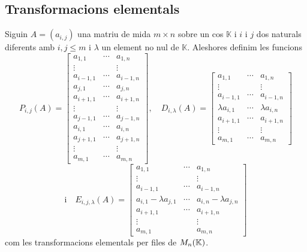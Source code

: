 \documentclass[../../Main.tex]{subfiles}
\begin{document}
	\subsection{Transformacions elementals}
	\begin{definition} %
		\label{def:transformacions elementals}
		Siguin \(A=(a_{i,j})\) una matriu de mida \(m\times n\) sobre un cos \(\mathbb{K}\) i \(i\) i \(j\) dos naturals diferents amb \(i,j\leq m\) i \(\lambda\) un element no nul de \(\mathbb{K}\). Aleshores definim les funcions
		\[P_{i,j}(A)=\left[\begin{matrix}
		a_{1,1} & \cdots & a_{1,n} \\
		\vdots & & \vdots \\
		a_{i-1,1} & \cdots & a_{i-1,n} \\
		a_{j,1} & \cdots & a_{j,n} \\
		a_{i+1,1} & \cdots & a_{i+1,n} \\
		\vdots & & \vdots \\
		a_{j-1,1} & \cdots & a_{j-1,n} \\
		a_{i,1} & \cdots & a_{i,n} \\
		a_{j+1,1} & \cdots & a_{j+1,n} \\
		\vdots & & \vdots \\
		a_{m,1} & \cdots & a_{m,n}
		\end{matrix}\right],\quad D_{i,\lambda}(A)=\left[\begin{matrix}
		a_{1,1} & \cdots & a_{1,n} \\
		\vdots & & \vdots \\
		a_{i-1,1} & \cdots & a_{i-1,n} \\
		\lambda a_{i,1} & \cdots & \lambda a_{i,n} \\
		a_{i+1,1} & \cdots & a_{i+1,n} \\
		\vdots & & \vdots \\
		a_{m,1} & \cdots & a_{m,n}
		\end{matrix}\right]\]
		\[\text{i}\quad E_{i,j,\lambda}(A)=\left[\begin{matrix}
		a_{1,1} & \cdots & a_{1,n} \\
		\vdots & & \vdots \\
		a_{i-1,1} & \cdots & a_{i-1,n} \\
		a_{i,1}-\lambda a_{j,1} & \cdots & a_{i,n}-\lambda a_{j,n}\\
		a_{i+1,1} & \cdots & a_{i+1,n} \\
		\vdots & & \vdots \\
		a_{m,1} & & a_{m,n}
		\end{matrix}\right]\]
		com les transformacions elementals per files de \(M_{n}(\mathbb{K})\).
	\end{definition}
\end{document}
